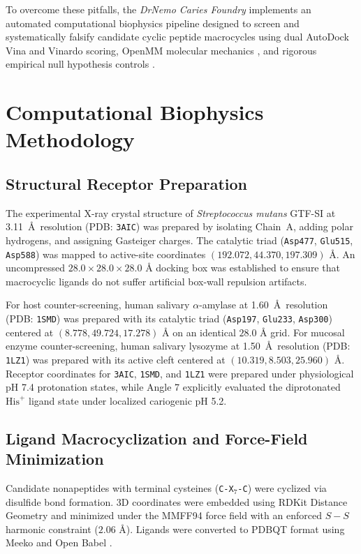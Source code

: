 \documentclass[11pt,a4paper]{article}
\begin{document}
To overcome these pitfalls, the \textit{DrNemo Caries Foundry} implements an automated computational biophysics pipeline designed to screen and systematically falsify candidate cyclic peptide macrocycles using dual AutoDock Vina \cite{Trott2010, Eberhardt2021} and Vinardo \cite{Quiroga2016} scoring, OpenMM molecular mechanics \cite{Eastman2017, Maier2015, Nguyen2013}, and rigorous empirical null hypothesis controls \cite{Popper1959}.

\section{Computational Biophysics Methodology}

\subsection{Structural Receptor Preparation}
The experimental X-ray crystal structure of \textit{Streptococcus mutans} GTF-SI at 3.11~\AA\ resolution (PDB: \texttt{3AIC}) \cite{Ito2011} was prepared by isolating Chain~A, adding polar hydrogens, and assigning Gasteiger charges. The catalytic triad (\texttt{Asp477}, \texttt{Glu515}, \texttt{Asp588}) was mapped to active-site coordinates $(192.072, 44.370, 197.309)\text{ \AA}$. An uncompressed $28.0 \times 28.0 \times 28.0\text{ \AA}$ docking box was established to ensure that macrocyclic ligands do not suffer artificial box-wall repulsion artifacts.

For host counter-screening, human salivary $\alpha$-amylase at 1.60~\AA\ resolution (PDB: \texttt{1SMD}) \cite{Ramasubbu1996} was prepared with its catalytic triad (\texttt{Asp197}, \texttt{Glu233}, \texttt{Asp300}) centered at $(8.778, 49.724, 17.278)\text{ \AA}$ on an identical $28.0\text{ \AA}$ grid. For mucosal enzyme counter-screening, human salivary lysozyme at 1.50~\AA\ resolution (PDB: \texttt{1LZ1}) was prepared with its active cleft centered at $(10.319, 8.503, 25.960)\text{ \AA}$. Receptor coordinates for \texttt{3AIC}, \texttt{1SMD}, and \texttt{1LZ1} were prepared under physiological pH 7.4 protonation states, while Angle 7 explicitly evaluated the diprotonated $\text{His}^+$ ligand state under localized cariogenic pH 5.2.

\subsection{Ligand Macrocyclization and Force-Field Minimization}
Candidate nonapeptides with terminal cysteines (\texttt{C-X$_7$-C}) were cyclized via disulfide bond formation. 3D coordinates were embedded using RDKit Distance Geometry \cite{Landrum2020} and minimized under the MMFF94 force field \cite{Halgren1996} with an enforced $S-S$ harmonic constraint ($2.06\text{ \AA}$). Ligands were converted to PDBQT format using Meeko \cite{Eberhardt2021} and Open Babel \cite{OBoyle2011}.
\end{document}
